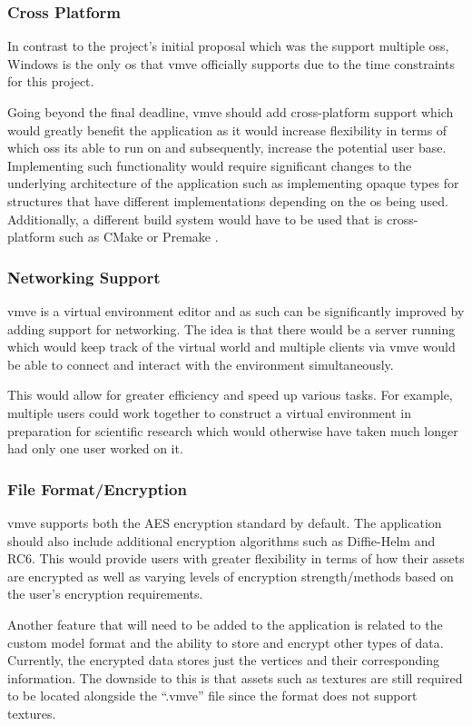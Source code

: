 \documentclass[11pt]{article}
\begin{document}
\subsubsection{Cross Platform}
In contrast to the project's initial proposal which was the support multiple
\glspl*{os}, Windows is the only \gls*{os} that \gls*{vmve} officially supports due
to the time constraints for this project. 

Going beyond the final deadline, \gls*{vmve} should add cross-platform support
which would greatly benefit the application as it would increase flexibility in
terms of which \glspl*{os} its able to run on and subsequently, increase the
potential user base. Implementing such functionality would require significant
changes to the underlying architecture of the application such as implementing
opaque types for structures that have different implementations depending on the
\gls*{os} being used. Additionally, a different build system would have to be
used that is cross-platform such as CMake \cite{cmake} or Premake \cite{premake}.

\subsubsection{Networking Support}
\gls*{vmve} is a virtual environment editor and as such can be significantly
improved by adding support for networking. The idea is that there would be a
server running which would keep track of the virtual world and multiple clients
via \gls*{vmve} would be able to connect and interact with the environment
simultaneously.

This would allow for greater efficiency and speed up various tasks. For example,
multiple users could work together to construct a virtual environment in
preparation for scientific research which would otherwise have taken much longer
had only one user worked on it.

\subsubsection{File Format/Encryption}
\gls*{vmve} supports both the AES encryption standard by default. The application
should also include additional encryption algorithms such as Diffie-Helm and
RC6. This would provide users with greater flexibility in terms of how their
assets are encrypted as well as varying levels of encryption strength/methods
based on the user's encryption requirements.

Another feature that will need to be added to the application is related to the
custom model format and the ability to store and encrypt other types of data.
Currently, the encrypted data stores just the vertices and their corresponding
information. The downside to this is that assets such as textures are still
required to be located alongside the ``.vmve'' file since the format does not
support textures.
\end{document}
